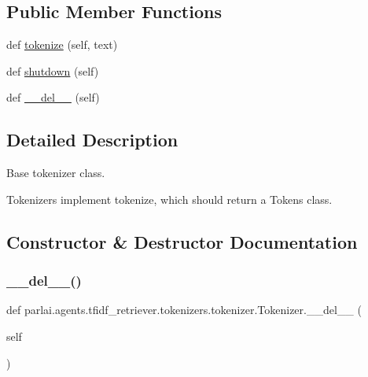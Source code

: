 \subsection*{Public Member Functions}
\begin{DoxyCompactItemize}
\item 
def \hyperlink{classparlai_1_1agents_1_1tfidf__retriever_1_1tokenizers_1_1tokenizer_1_1Tokenizer_a548699f403463496523213f3cf80c6c6}{tokenize} (self, text)
\item 
def \hyperlink{classparlai_1_1agents_1_1tfidf__retriever_1_1tokenizers_1_1tokenizer_1_1Tokenizer_a9c4af22e2a89737e6464bf031d16e32c}{shutdown} (self)
\item 
def \hyperlink{classparlai_1_1agents_1_1tfidf__retriever_1_1tokenizers_1_1tokenizer_1_1Tokenizer_aa2153a444d794bde7283f8bad237a8e6}{\+\_\+\+\_\+del\+\_\+\+\_\+} (self)
\end{DoxyCompactItemize}


\subsection{Detailed Description}
\begin{DoxyVerb}Base tokenizer class.

Tokenizers implement tokenize, which should return a Tokens class.
\end{DoxyVerb}
 

\subsection{Constructor \& Destructor Documentation}
\mbox{\label{classparlai_1_1agents_1_1tfidf__retriever_1_1tokenizers_1_1tokenizer_1_1Tokenizer_aa2153a444d794bde7283f8bad237a8e6}} 
\subsubsection{\texorpdfstring{\+\_\+\+\_\+del\+\_\+\+\_\+()}{\_\_del\_\_()}}
{\footnotesize\ttfamily def parlai.\+agents.\+tfidf\+\_\+retriever.\+tokenizers.\+tokenizer.\+Tokenizer.\+\_\+\+\_\+del\+\_\+\+\_\+ (\begin{DoxyParamCaption}\item[{}]{self }\end{DoxyParamCaption})}



